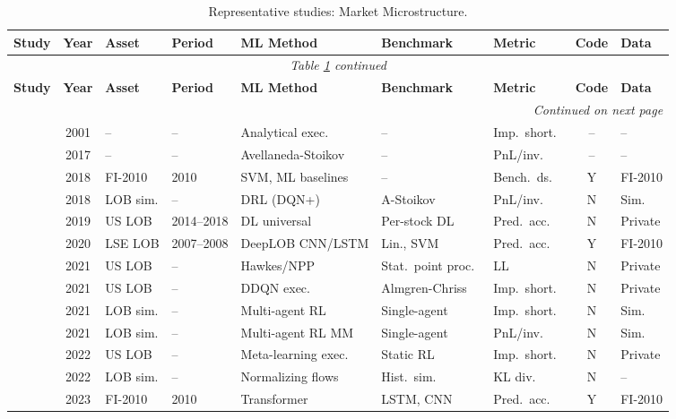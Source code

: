 \begin{longtable}{@{}p{2.4cm} c p{1.0cm} p{1.0cm} p{2.0cm} p{1.9cm} p{1.4cm} c p{1.4cm}@{}}
\caption{Representative studies: Market Microstructure.}\label{tab:master_microstructure} \\
\toprule
\textbf{Study} & \textbf{Year} & \textbf{Asset} & \textbf{Period} & \textbf{ML Method} & \textbf{Benchmark} & \textbf{Metric} & \textbf{Code} & \textbf{Data} \\
\midrule
\endfirsthead
\multicolumn{9}{c}{\textit{Table \ref{tab:master_microstructure} continued}} \\
\toprule
\textbf{Study} & \textbf{Year} & \textbf{Asset} & \textbf{Period} & \textbf{ML Method} & \textbf{Benchmark} & \textbf{Metric} & \textbf{Code} & \textbf{Data} \\
\midrule
\endhead
\midrule
\multicolumn{9}{r}{\textit{Continued on next page}} \\
\endfoot
\bottomrule
\endlastfoot

\citet{Almgren2001}    & 2001 & --       & --         & Analytical exec.\  & --             & Imp.\ short.\ & -- & --     \\
\citet{Gueant2017}     & 2017 & --       & --         & Avellaneda-Stoikov &--              & PnL/inv.\     & -- & --     \\
\citet{Ntakaris2018}   & 2018 & FI-2010  & 2010       & SVM, ML baselines  & --             & Bench.\ ds.\  & Y & FI-2010 \\
\citet{Spooner2018}    & 2018 & LOB sim. & --         & DRL (DQN+)         & A-Stoikov      & PnL/inv.\     & N & Sim.   \\
\citet{Sirignano2019}  & 2019 & US LOB   & 2014--2018 & DL universal       & Per-stock DL   & Pred.\ acc.\  & N & Private \\
\citet{Zhang2019LOB}   & 2020 & LSE LOB  & 2007--2008 & DeepLOB CNN/LSTM   & Lin., SVM      & Pred.\ acc.\  & Y & FI-2010 \\
\citet{Cont2021}       & 2021 & US LOB   & --         & Hawkes/NPP         & Stat.\ point proc.\ & LL       & N & Private \\
\citet{Ning2021}       & 2021 & US LOB   & --         & DDQN exec.\        & Almgren-Chriss & Imp.\ short.\ & N & Private \\
\citet{Fang2021}       & 2021 & LOB sim. & --         & Multi-agent RL     & Single-agent   & Imp.\ short.\ & N & Sim.   \\
\citet{Gasperov2021}   & 2021 & LOB sim. & --         & Multi-agent RL MM  & Single-agent   & PnL/inv.\     & N & Sim.   \\
\citet{Schnaubelt2022} & 2022 & US LOB   & --         & Meta-learning exec.\ & Static RL    & Imp.\ short.\ & N & Private \\
\citet{Shi2022}        & 2022 & LOB sim. & --         & Normalizing flows  & Hist.\ sim.\   & KL div.\      & N & --     \\
\citet{Kolm2023}       & 2023 & FI-2010  & 2010       & Transformer        & LSTM, CNN      & Pred.\ acc.\  & Y & FI-2010 \\

\end{longtable}

